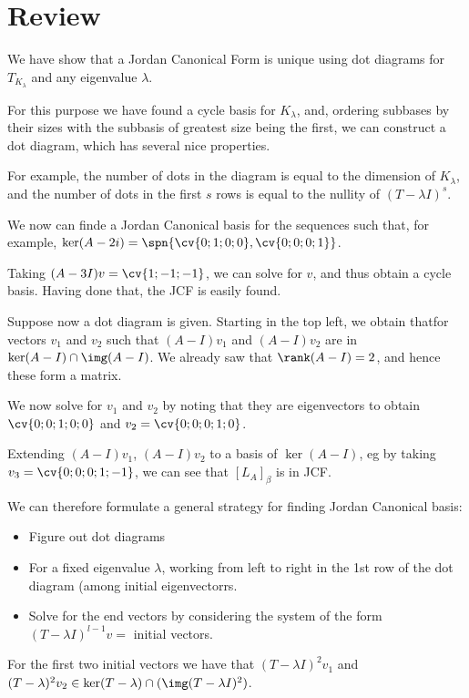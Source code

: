 \documentclass[11pt]{scrartcl}
\begin{document}
\section{Review}

We have show that a Jordan Canonical Form is unique using dot diagrams
for $T_{K_{\lambda}}$ and any eigenvalue $\lambda$.

For this purpose we have found a cycle basis for $K_{\lambda}$, and,
ordering subbases by their sizes with the subbasis of greatest size
being the first, we can construct a dot diagram, which has several
nice properties.

For example, the number of dots in the diagram is equal to the
dimension of $K_{\lambda}$, and the number of dots in the first $s$
rows is equal to the nullity of $(T-\lambda I)^s$.

We now can finde a Jordan Canonical basis for the sequences such that,
for example, $\ker (A-2i) = \spn{\cv{0;1;0;0}, \cv{0;0;0;1}}$.

Taking $(A-3I) v= \cv{1;-1;-1}$, we can solve for $v$, and thus obtain a cycle basis. Having done that, the JCF is easily found.

Suppose now a dot diagram is given. Starting in the top left, we
obtain thatfor vectors $v_{1}$ and $v_2$ such that $(A-I)v_1 $ and
$(A-I)v_2$ are in $\ker(A-I)\cap \img (A-I)$. We already saw that
$\rank (A-I) = 2$, and hence these form a matrix.

We now solve for $v_{1}$ and $v_{2}$ by noting that they are
eigenvectors to obtain  $\cv{0;0;1;0;0}$ and $v_2=\cv{0;0;0;1;0}$.

Extending $(A-I)v_{1}$, $(A-I)v_{2}$ to a basis of $\ker(A-I)$, eg by
taking $v_3 =\cv{0;0;0;1;-1}$, we can see that $[L_{A}]_{\beta}$ is in
JCF.

We can therefore formulate a general strategy for finding  Jordan Canonical basis:

\begin{itemize}
\item Figure out dot diagrams
\item For a fixed eigenvalue $\lambda$, working from left to right in
  the 1st row of the dot diagram (among initial eigenvectorrs. 
\item Solve for the end vectors by considering the system of the form $(T-\lambda I)^{l-1}v =$ initial vectors.
\end{itemize}
\begin{example}

  For the first two initial vectors we have that $(T-\lambda I)^2v_1$
  and $(T-\lambda)^2v_2 \in \ker(T-\lambda)\cap(\img(T-\lambda I)^{2})$.

\end{example}
\end{document}
